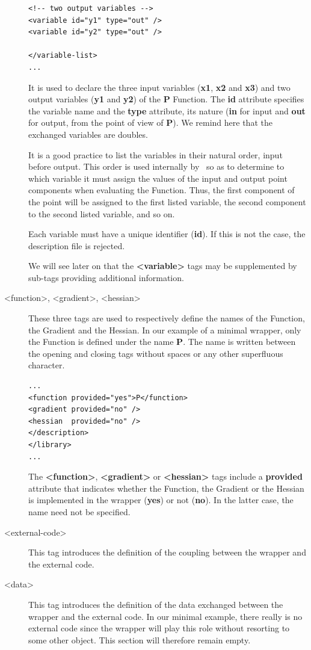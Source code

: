 \begin{description}
\begin{lstlisting}[frame=TBRL]
<!-- two output variables -->
<variable id="y1" type="out" />
<variable id="y2" type="out" />

</variable-list>
...
\end{lstlisting}

It is used to declare the three input variables ({\bf x1}, {\bf x2} and {\bf x3}) and two output variables ({\bf y1} and {\bf y2}) of the {\bf P} Function. The {\bf id} attribute specifies the variable name and the {\bf type} attribute, its nature ({\bf in} for input and {\bf out} for output, from the point of view of {\bf P}). We remind here that the exchanged variables are doubles.

It is a good practice to list the variables in their natural order, input before output. This order is used internally by \OT\ so as to determine to which variable it must assign the values of the input and output point components when evaluating the Function. Thus, the first component of the point will be assigned to the first listed variable, the second component to the second listed variable, and so on.

Each variable must have a unique identifier ({\bf id}). If this is not the case, the description file is rejected.

We will see later on that the {\bf <variable>} tags may be supplemented by sub-tags providing additional information.

\item[<function>, <gradient>, <hessian>] These three tags are used to respectively define the names of the Function, the Gradient and the Hessian. In our example of a minimal wrapper, only the Function is defined under the name {\bf P}. The name is written between the opening and closing tags without spaces or any other superfluous character.

\lstset{language=XML, basicstyle=\normalsize}
\begin{lstlisting}[frame=TBRL]
...
<function provided="yes">P</function>
<gradient provided="no" />
<hessian  provided="no" />
</description>
</library>
...
\end{lstlisting}

The {\bf <function>}, {\bf <gradient>} or {\bf <hessian>} tags include a {\bf provided} attribute that indicates whether the Function, the Gradient or the Hessian is implemented in the wrapper ({\bf yes}) or not ({\bf no}). In the latter case, the name need not be specified.

\item[<external-code>] This tag introduces the definition of the coupling between the wrapper and the external code.

\item[<data>] This tag introduces the definition of the data exchanged between the wrapper and the external code. In our minimal example, there really is no external code since the wrapper will play this role without resorting to some other object. This section will therefore remain empty.
\end{description}

